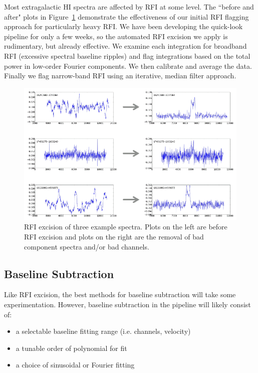 Most extragalactic HI spectra are affected by RFI at some level.  The ``before and after" plots in Figure~\ref{fig:RFIfigure} demonstrate the effectiveness of our initial RFI flagging approach for particularly heavy RFI.  We have been developing the quick-look pipeline for only a few weeks, so the automated RFI excision we apply is rudimentary, but already effective. We examine each integration for broadband RFI (excessive spectral baseline ripples) and flag integrations based on the total power in low-order Fourier components. We then calibrate and average the data. Finally we flag narrow-band RFI using an iterative, median filter approach.

\begin{figure}[ht!]
\centering%
\includegraphics[width=5in]{part7/Masters_P66/P66_f1}
\caption{RFI excision of three example spectra.  Plots on the left are before RFI excision and plots on the right are the removal of bad component spectra and/or bad channels.}
\label{fig:RFIfigure}
\end{figure}

\subsection{Baseline Subtraction}

Like RFI excision, the best methods for baseline subtraction will take some experimentation.  However, baseline subtraction in the pipeline will likely consist of:

\begin{itemize}
\item a selectable baseline fitting range (i.e. channels, velocity)
\item a tunable order of polynomial for fit
\item a choice of sinusoidal or Fourier fitting
\end{itemize}

